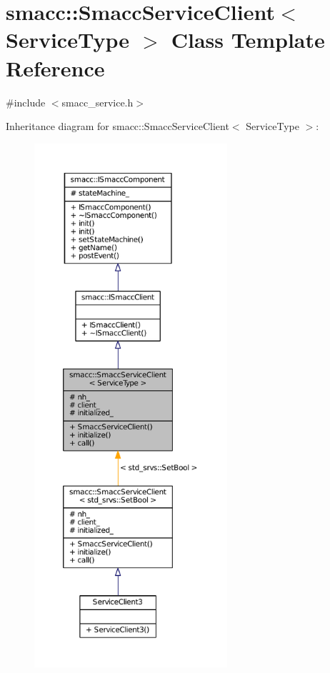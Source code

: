 \hypertarget{classsmacc_1_1SmaccServiceClient}{}\section{smacc\+:\+:Smacc\+Service\+Client$<$ Service\+Type $>$ Class Template Reference}
\label{classsmacc_1_1SmaccServiceClient}


{\ttfamily \#include $<$smacc\+\_\+service.\+h$>$}



Inheritance diagram for smacc\+:\+:Smacc\+Service\+Client$<$ Service\+Type $>$\+:
\nopagebreak
\begin{figure}[H]
\begin{center}
\leavevmode
\includegraphics[height=550pt]{classsmacc_1_1SmaccServiceClient__inherit__graph}
\end{center}
\end{figure}


